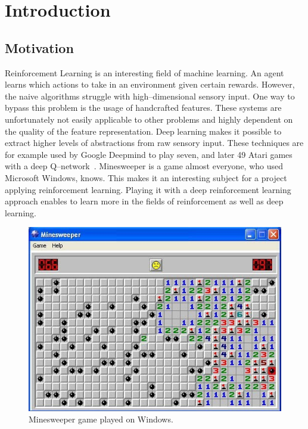 \chapter{Introduction}

\section{Motivation}
Reinforcement Learning is an interesting field of machine learning. An agent learns which
actions to take in an environment given certain rewards. However, the naive algorithms
struggle with high--dimensional sensory input. One way to bypass this problem is the
usage of handcrafted features. These systems are unfortunately not easily applicable
to other problems and highly dependent on the quality of the feature representation. Deep
learning makes it possible to extract higher levels of abstractions from raw sensory input.
These techniques are for example used by Google Deepmind to play seven, and later 49 Atari games with a deep Q--network~\cite{mnih2013playing, mnih2015human}.
Minesweeper is a game almost everyone, who used Microsoft Windows, knows. 
This makes it an interesting subject for a project applying reinforcement learning. Playing
it with a deep reinforcement learning approach enables to learn more in the fields of reinforcement as well as deep learning.

\begin{figure}
	\centering
	\includegraphics[scale=0.8]{images/img_26041_minesweeper_large.jpg}
	\caption{Minesweeper game played on Windows.}
	\label{fig:minesweeper}
\end{figure}

